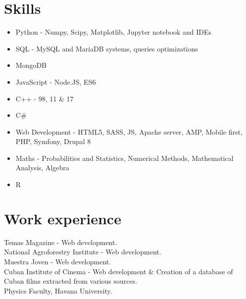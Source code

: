 \documentclass[11pt]{article} %
\begin{document}
\section*{Skills}

\begin{itemize}
	\item Python - Numpy, Scipy, Matplotlib, Jupyter notebook and IDEs
	\item SQL - MySQL and MariaDB systems, queries optimizations
	\item MongoDB
	\item JavaScript - Node.JS, ES6
	\item C++ - 98, 11 \& 17
	\item C\#
	\item Web Development - HTML5, SASS, JS, Apache server, AMP, Mobile first, PHP, Symfony, Drupal 8
	\item Maths - Probabilities and Statistics, Numerical Methods, Mathematical Analysis, Algebra
	\item R
	
\end{itemize} %


\section*{Work experience}

 Temas Magazine - Web development. \\
 National Agroforestry Institute - Web development. \\
 Muestra Joven - Web development. \\
 Cuban Institute of Cinema - Web development \& Creation of a database of Cuban films extracted from various sources. \\
 Physics Faculty, Havana University. \\



\end{document}
